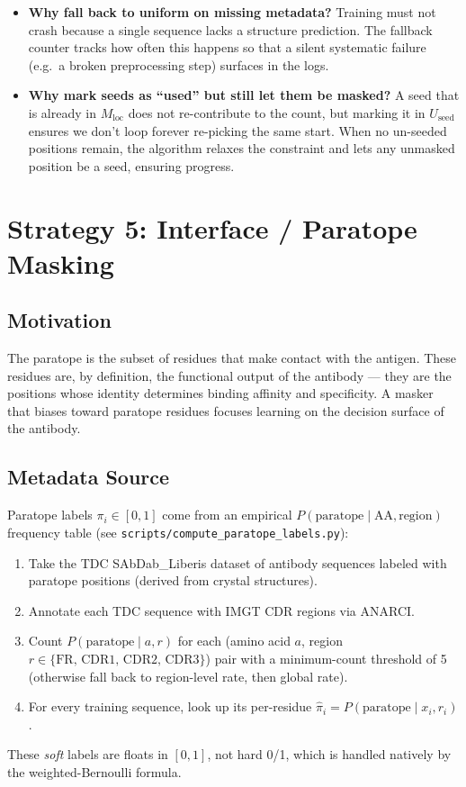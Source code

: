 \documentclass[11pt]{article}
\begin{document}
\begin{itemize}
\item \textbf{Why fall back to uniform on missing metadata?} Training
must not crash because a single sequence lacks a structure
prediction. The fallback counter tracks how often this happens so
that a silent systematic failure (e.g.\ a broken preprocessing step)
surfaces in the logs.
\item \textbf{Why mark seeds as ``used'' but still let them be masked?}
A seed that is already in $M_{\text{loc}}$ does not re-contribute to
the count, but marking it in $U_{\text{seed}}$ ensures we don't loop
forever re-picking the same start. When no un-seeded positions remain,
the algorithm relaxes the constraint and lets any unmasked position
be a seed, ensuring progress.
\end{itemize}

\section{Strategy 5: Interface / Paratope Masking}

\subsection{Motivation}
The paratope is the subset of residues that make contact with the
antigen. These residues are, by definition, the functional output of
the antibody --- they are the positions whose identity determines
binding affinity and specificity. A masker that biases toward
paratope residues focuses learning on the decision surface of the
antibody.

\subsection{Metadata Source}
Paratope labels $\pi_i \in [0, 1]$ come from an empirical
$P(\text{paratope} \mid \text{AA}, \text{region})$ frequency table
(see \texttt{scripts/compute\_paratope\_labels.py}):
\begin{enumerate}
\item Take the TDC SAbDab\_Liberis dataset of antibody sequences
labeled with paratope positions (derived from crystal structures).
\item Annotate each TDC sequence with IMGT CDR regions via ANARCI.
\item Count $P(\text{paratope} \mid a, r)$ for each
(amino acid $a$, region $r \in \{\text{FR, CDR1, CDR2, CDR3}\}$) pair
with a minimum-count threshold of 5 (otherwise fall back to region-level
rate, then global rate).
\item For every training sequence, look up its per-residue
$\hat{\pi}_i = P(\text{paratope} \mid x_i, r_i)$.
\end{enumerate}
These \emph{soft} labels are floats in $[0,1]$, not hard 0/1, which is
handled natively by the weighted-Bernoulli formula.
\end{document}
